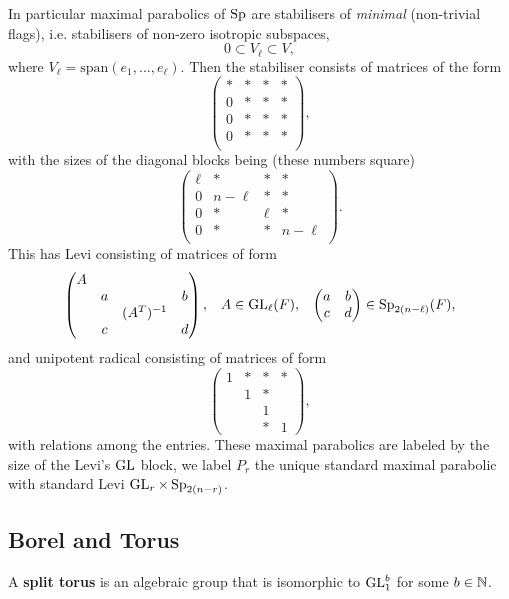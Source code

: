 \vspace{5mm}
    \label{maximal_parabolic}
    In particular maximal parabolics of \(\operatorname{Sp}\) are stabilisers of \textit{minimal} (non-trivial flags), i.e. stabilisers of non-zero isotropic subspaces,
    \[0 \subset V_\ell \subset V,\]
    where \(V_\ell = \mathrm{span}(e_1, ..., e_\ell)\). Then the stabiliser consists of matrices of the form
    \[\begin{pmatrix}
        * &*&*&* \\
        0 &*&*&* \\
        0 &*&*&* \\
        0 &*&*&* \\
    \end{pmatrix},\]
    with the sizes of the diagonal blocks being (these numbers square)
    \[\begin{pmatrix}
        \ell &*&*&* \\
        0 &n-\ell&*&* \\
        0 &*&\ell&* \\
        0 &*&*&n-\ell \\
    \end{pmatrix}.\]
    This has Levi consisting of matrices of form 
    \[\begin{pmatrix}
        A &&& \\
         &a&&b \\
         &&(A^T)^{-1}& \\
         &c&&d \\
    \end{pmatrix}, \;\;\; A\in \operatorname{GL}_\ell(F), \;\;\; \begin{pmatrix}
        a & b\\
        c & d \\
    \end{pmatrix} \in \operatorname{Sp}_{2(n-\ell)}(F),\]
    and unipotent radical consisting of matrices of form 
    \[\begin{pmatrix}
        1 &*&*&* \\
        & 1&*& \\
        && 1& \\
        &&*&1
    \end{pmatrix},\]
    with relations among the entries. These maximal parabolics are labeled by the size of the Levi's \(\operatorname{GL}\) block, we label \(P_r\) the unique standard maximal parabolic with standard Levi \(\operatorname{GL}_r \times \operatorname{Sp}_{2(n-r)}\).\label{max-parabolic} 


    \subsection{Borel and Torus}\label{borel_torus}    
    A \textbf{split torus} is an algebraic group that is isomorphic to \(\operatorname{GL}_1^b\) for some \(b\in\N\).

